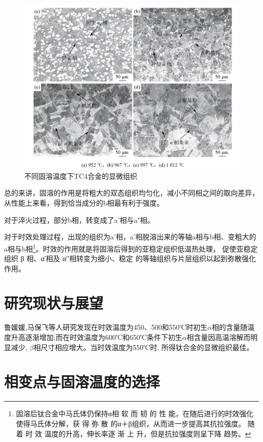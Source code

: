 \documentclass[
class = book,
zihao = -4,
font = noto,
paper = a4paper,
openany
]{easybook}
\begin{document}
\begin{figure}[h!]
	\centering
	\includegraphics[width=0.7\linewidth]{金相_丙}
	\caption{不同固溶温度下TC4合金的显微组织}
	\label{fig:}
\end{figure}


总的来讲，固溶的作用是将粗大的双态组织均匀化，减小不同相之间的取向差异，从性能上来看，得到恰当成分的b相最有利于强度。

对于淬火过程，部分b相，转变成了a'相与a"相。

对于时效处理过程，出现的组织为a'相，a'相脱溶出来的等轴a相与b相、变粗大的a相与b相\footnote{固溶后钛合金中马氏体仍保持α相 软 而 韧 的 性 能，在随后进行的时效强化使得马氏体分解，获 得 弥 散 的α＋β组织，从而进一步提高其抗拉强度。 随 着 时 效 温度的升高，伸长率逐 渐 上 升，但是抗拉强度则呈下降 趋势。}。\cite{zhanghaoyinGurongShixiaoduiTC4taihejinzuzhihelixuexingnengdeyingxiang2014}时效的作用就是将固溶后得到的亚稳定组织低温热处理， 促使亚稳定组织 β 相、α′相及 α′′相转变为细小、稳定 的等轴组织与片层组织以起到弥散强化作用。

\section{研究现状与展望}
 鲁媛媛,马保飞等人研究发现在时效温度为450、500和550℃时初生$\alpha $相的含量随温度升高逐渐增加;而在时效温度为600℃和650℃条件下初生$\alpha $相含量因高温溶解而明显减少, $\beta $相尺寸相应增大。当时效温度为550℃时, 所得钛合金的显微组织最佳\cite{timing}。



\section{相变点与固溶温度的选择}
\end{document}
